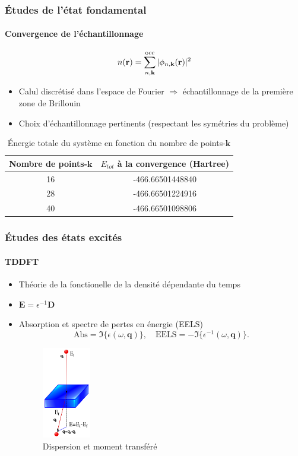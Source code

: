 \documentclass[french]{beamer}
\newcommand{\vb}[1]{\mathbf{#1}}
\newcommand{\V}[1]{\textnormal{#1}}
\begin{document}
\begin{frame}
\frametitle{Études de l'état fondamental}
\framesubtitle{Convergence de l'échantillonnage}

\begin{equation*}
  n(\vb{r}) = \sum_{n, \vb{k}}^{\V{occ}} |\phi_{n, \vb{k}}(\vb{r})|^2
\end{equation*}

\begin{itemize}
\item Calul discrétisé dans l'espace de Fourier $\Longrightarrow$ échantillonnage de la première zone de Brillouin
\item Choix d'échantillonnage pertinents (respectant les symétries du problème)

\end{itemize}
\begin{table}[ht]
  \caption{Énergie totale du système en fonction du nombre de points-$\textbf{k}$}
  \centering
  \begin{tabular}{c c}
    \toprule
    Nombre de points-$\textbf{k}$  &  $E_{tot}$ à la convergence (Hartree)
    \\
    \midrule
    16    &  -466.66501448840
    \\
    28    &  -466.66501224916
    \\
    40    &  -466.66501098806
    \\
    \bottomrule
  \end{tabular}
\end{table}

\end{frame}

\begin{frame}
\frametitle{Études des états excités}
\framesubtitle{TDDFT}
\begin{itemize}
\item Théorie de la fonctionelle de la densité dépendante du temps
\item $\vb{E} = \epsilon^{-1}\vb{D}$
\item Absorption et spectre de pertes en énergie (EELS)
\begin{equation*}
  \textrm{Abs} = \Im\{\epsilon(\omega, \textbf{q})\},
  \quad
  \textrm{EELS} = -\Im\{\epsilon^{-1}(\omega, \textbf{q})\}.
\end{equation*}

\begin{figure}[!h]
  \includegraphics[width=0.2\textwidth]{eels}
  \caption{Dispersion et moment transféré}
\end{figure}
\end{itemize}
\end{frame}
\end{document}
